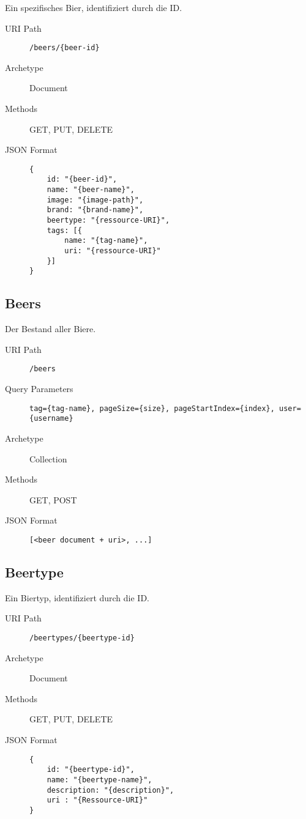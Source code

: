 \documentclass[10pt,a4paper]{scrartcl}
\begin{document}
Ein spezifisches Bier, identifiziert durch die ID.

\begin{description}
	\item[URI Path] \texttt{/beers/\{beer-id\}}
	\item[Archetype] Document
	\item[Methods] GET, PUT, DELETE
	\item[JSON Format] \hfill
\begin{lstlisting}
{	
	id: "{beer-id}",
	name: "{beer-name}",
	image: "{image-path}",
	brand: "{brand-name}",
	beertype: "{ressource-URI}",
	tags: [{
		name: "{tag-name}",
		uri: "{ressource-URI}"
	}]
}
\end{lstlisting}
\end{description}


\subsection{Beers}

Der Bestand aller Biere.

\begin{description}
	\item[URI Path] \texttt{/beers}
 	\item[Query Parameters] \texttt{tag=\{tag-name\}, pageSize=\{size\}, pageStartIndex=\{index\}, user=\{username\}}
	\item[Archetype] Collection
	\item[Methods] GET, POST
	\item[JSON Format] \hfill
\begin{lstlisting}
[<beer document + uri>, ...]
\end{lstlisting}
\end{description}


\subsection{Beertype}

Ein Biertyp, identifiziert durch die ID.

\begin{description}
	\item[URI Path] \texttt{/beertypes/\{beertype-id\}}
	\item[Archetype] Document
	\item[Methods] GET, PUT, DELETE
	\item[JSON Format] \hfill
\begin{lstlisting}
{	
	id: "{beertype-id}",
	name: "{beertype-name}",
	description: "{description}",
	uri : "{Ressource-URI}"
}
\end{lstlisting}
\end{description}
\end{document}
